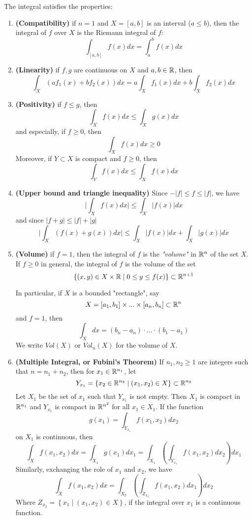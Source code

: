 The integral satisfies the properties:
\begin{enumerate}
    \item \textbf{(Compatibility)} if $n = 1$ and $X = [a,b]$ is an interval ($a \le b$),
          then the integral of $f$ over $X$ is the Riemann integral of $f$:
          \[ \int_{[a,b]} f(x)dx = \int_a^b f(x)dx \]
    \item \textbf{(Linearity)} if $f,g$ are continuous on $X$ and $a,b \in \mathbb{R}$, then
          \[ \int_X (a f_1(x) + b f_2(x))dx = a \int_X f_1(x)dx + b \int_X f_2(x)dx \]
    \item \textbf{(Positivity)} if $f \le g$, then
          \[ \int_X f(x) dx \le \int_X g(x)dx \]
          and especially, if $f \ge 0$, then
          \[ \int_X f(x)dx \ge 0 \]
          Moreover, if $Y \subset X$ is compact and $f \ge 0$, then
          \[ \int_Y f(x)dx \le \int_X f(x)dx \]
    \item \textbf{(Upper bound and triangle inequality)} Since $-|f| \le f \le |f|$,
          we have
          \[ \Big| \int_X f(x)dx \Big| \le \int_X \Big| f(x) \Big| dx\]
          and since $|f + g| \le |f| + |g|$
          \[ \Big| \int_X (f(x) + g(x)) dx \Big| \le \int_X \Big| f(x)\Big|dx + \int_X \Big| g(x) \Big| dx\]
    \item \textbf{(Volume)} if $f = 1$, then the integral of $f$ is the \textit{"volume"} in $\mathbb{R}^n$ of the set $X$. If
          $f \ge 0$ in general, the integral of $f$ is the volume of the set
          \[ \left\{ (x,y) \in X \times \mathbb{R} \mid 0 \le y \le f(x) \right\} \subset \mathbb{R}^{n+1} \]

          In particular, if $X$ is a bounded "rectangle", say
          \[ X = [a_1,b_1] \times ... \times [a_n, b_n] \subset \mathbb{R}^n \]
          and $f = 1$, then
          \[ \int_X dx = (b_n - a_n) \cdot \dots \cdot (b_1 - a_1) \]
          We write $Vol(X)$ or $Vol_n(X)$ for the volume of $X$.

    \item \textbf{(Multiple Integral, or Fubini's Theorem)} If $n_1, n_2 \ge 1$ are integers such that
          $n = n_1 + n_2$, then for $x_1 \in \mathbb{R}^{n_1}$, let
          \[ Y_{x_1} = \left\{ x_2 \in \mathbb{R}^{n_2} \mid (x_1, x_2) \in X \right\} \subset \mathbb{R}^{n_2} \]
          Let $X_1$ be the set of $x_1$ such that $Y_{x_1}$ is not empty. Then $X_1$ is compact in $\mathbb{R}^{n_1}$
          and $Y_{x_1}$ is compact in $\mathbb{R}^{n^2}$ for all $x_1 \in X_1$. If the function
          \[ g(x_1) = \int_{Y_{x_1}} f(x_1, x_2)dx_2 \]
          on $X_1$ is continuous, then
          \[ \int_X f(x_1, x_2)dx = \int_{X_1} g(x_1)dx_1 = \int_{X_1} \left( \int_{Y_{x_1}} f(x_1, x_2)dx_2 \right) dx_1\]
          Similarly, exchanging the role of $x_1$ and $x_2$, we have
          \[ \int_X f(x_1, x_2)dx = \int_{X_2} \left( \int_{Z_{x_2}} f(x_1, x_2)dx_1 \right) dx_2 \]
          Where $Z_{x_2} = \left\{ x_1 \mid (x_1, x_2) \in X \right\}$, if the integral over $x_1$ is a continuous function.


\end{enumerate}
